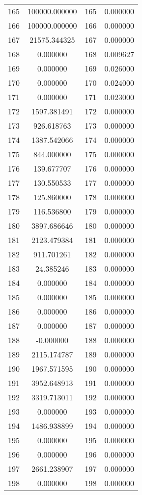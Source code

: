 \documentclass[12pt]{article}
\begin{document}
\begin{longtable}{@{}cccc@{}}
165 & 100000.000000 & 165 & 0.000000 \\
166 & 100000.000000 & 166 & 0.000000 \\
167 & 21575.344325 & 167 & 0.000000 \\
168 & 0.000000 & 168 & 0.009627 \\
169 & 0.000000 & 169 & 0.026000 \\
170 & 0.000000 & 170 & 0.024000 \\
171 & 0.000000 & 171 & 0.023000 \\
172 & 1597.381491 & 172 & 0.000000 \\
173 & 926.618763 & 173 & 0.000000 \\
174 & 1387.542066 & 174 & 0.000000 \\
175 & 844.000000 & 175 & 0.000000 \\
176 & 139.677707 & 176 & 0.000000 \\
177 & 130.550533 & 177 & 0.000000 \\
178 & 125.860000 & 178 & 0.000000 \\
179 & 116.536800 & 179 & 0.000000 \\
180 & 3897.686646 & 180 & 0.000000 \\
181 & 2123.479384 & 181 & 0.000000 \\
182 & 911.701261 & 182 & 0.000000 \\
183 & 24.385246 & 183 & 0.000000 \\
184 & 0.000000 & 184 & 0.000000 \\
185 & 0.000000 & 185 & 0.000000 \\
186 & 0.000000 & 186 & 0.000000 \\
187 & 0.000000 & 187 & 0.000000 \\
188 & -0.000000 & 188 & 0.000000 \\
189 & 2115.174787 & 189 & 0.000000 \\
190 & 1967.571595 & 190 & 0.000000 \\
191 & 3952.648913 & 191 & 0.000000 \\
192 & 3319.713011 & 192 & 0.000000 \\
193 & 0.000000 & 193 & 0.000000 \\
194 & 1486.938899 & 194 & 0.000000 \\
195 & 0.000000 & 195 & 0.000000 \\
196 & 0.000000 & 196 & 0.000000 \\
197 & 2661.238907 & 197 & 0.000000 \\
198 & 0.000000 & 198 & 0.000000 \\

\end{longtable}
\end{document}
